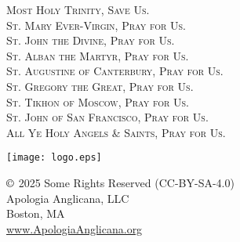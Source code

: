 \fancyhead[RE,LO]{}\fancyhead[RO,LE]{}\fancyhead[C]{}\thispagestyle{empty}
   \begin{center}
   	\textsc{
   	Most Holy Trinity, Save Us.\\
   	\small{
   	St. Mary Ever-Virgin, Pray for Us.\\
   	St. John the Divine, Pray for Us.\\
   	St. Alban the Martyr, Pray for Us.\\
   	St. Augustine of Canterbury, Pray for Us.\\
    St. Gregory the Great, Pray for Us.\\
    St. Tikhon of Moscow, Pray for Us.\\
    St. John of San Francisco, Pray for Us.\\
   	All Ye Holy Angels \& Saints, Pray for Us.
   	}
   	}
   	\vfill
   	\par
   	\texttt{[image: logo.eps]}
			\par
	$\copyright$ 2025 Some Rights Reserved (CC-BY-SA-4.0)\\
	Apologia Anglicana, LLC\\
    Boston, MA\\
	\url{www.ApologiaAnglicana.org}
   \end{center}